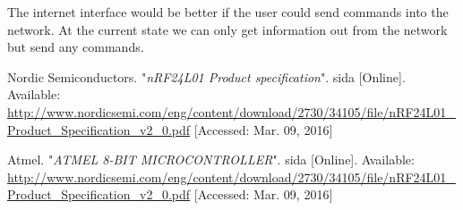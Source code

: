 \documentclass[a4paper,11pt]{article}
\begin{document}
The internet interface would be better if the user could send commands
into the network. At the current state we can only get information out
from the network but send any commands.

\begin{thebibliography}{2}

  Nordic Semiconductors. "\emph{nRF24L01 Product specification}". sida [Online]. Available: \url{http://www.nordicsemi.com/eng/content/download/2730/34105/file/nRF24L01_Product_Specification_v2_0.pdf} [Accessed: Mar. 09, 2016]

  Atmel. "\emph{ATMEL 8-BIT MICROCONTROLLER}". sida [Online]. Available: \url{http://www.nordicsemi.com/eng/content/download/2730/34105/file/nRF24L01_Product_Specification_v2_0.pdf} [Accessed: Mar. 09, 2016]

\end{thebibliography}
\end{document}
